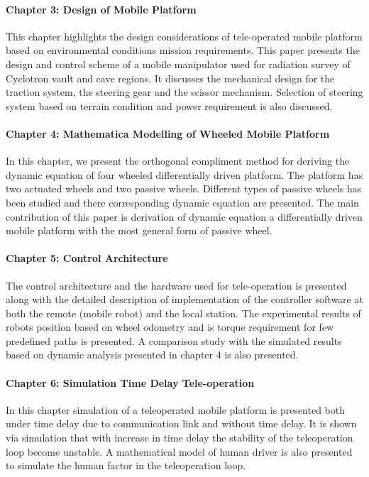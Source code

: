 \paragraph*{Chapter 3: Design of Mobile Platform\\}
This chapter highlights the design considerations of tele-operated mobile platform based on environmental conditions mission requirements. This paper presents the design and control scheme of a mobile manipulator used for radiation survey of Cyclotron vault and cave regions. It discusses the mechanical design for the traction system, the steering gear and the scissor mechanism. Selection of  steering system based on terrain condition and power requirement is also discussed.   
\paragraph*{Chapter 4: Mathematica Modelling of Wheeled Mobile Platform \\}
In this chapter, we present the orthogonal compliment method for deriving the dynamic equation of four wheeled differentially driven platform. The platform has two actuated wheels and two passive wheels. Different types of passive wheels has been studied and there corresponding dynamic equation are presented. The main contribution of this paper is derivation of dynamic equation a differentially driven  mobile platform with the most general form of passive wheel.
\paragraph*{Chapter 5: Control Architecture\\}
The control architecture and the hardware used for tele-operation is presented along with the detailed description of implementation of the controller software at both the remote (mobile robot)  and the local station. The experimental results of robots position based on wheel odometry and is torque requirement for few predefined paths is presented. A comparison study  with the simulated results based on dynamic analysis presented in chapter 4 is also presented.  
\paragraph*{Chapter 6: Simulation Time Delay Tele-operation \\}

In this chapter simulation of a teleoperated mobile platform is presented both under time delay due to communication link and without time delay. It is shown via simulation that with increase in time delay the stability of the teleoperation loop become unstable. A mathematical model of human driver is also presented to simulate the human factor in the teleoperation loop.
 
